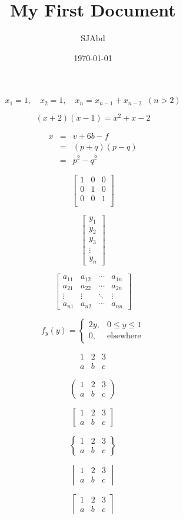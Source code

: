 \documentclass[a4paper,12pt]{article}
\begin{document}
\title{My First Document}
\author{SJAbd}
\date{\today}
\maketitle


$$
x_1=1,\quad x_2=1,\quad x_n=x_{n-1}+x_{n-2}\;\;(n>2)
$$


\begin{equation*}
(x+2)(x-1)=x^2+x-2
\end{equation*}


\begin{eqnarray*}
x&=&v+6b-f\\
&=&(p+q)(p-q)\\
&=&p^2-q^2
\end{eqnarray*}



\[
\begin{bmatrix}
1&0&0\\
0&1&0\\
0&0&1\\
\end{bmatrix}
\]



\[
\begin{bmatrix}
y_1\\
y_2\\
y_3\\
\vdots\\
y_n
\end{bmatrix}
\]




\[
\begin{bmatrix}
a_{11}&a_{12}&\cdots &a_{1n} \\
a_{21}&a_{22}&\cdots &a_{2n} \\
\vdots & \vdots & \ddots & \vdots\\
a_{n1}&a_{n2}&\cdots &a_{nn}
\end{bmatrix}
\]



\[f_y(y)=\left\{\begin{array}{cl}
2y,&0\leq y \leq 1\\
0,& \mbox{elsewhere}\end{array}\right.\]


\newpage


$$
\begin{matrix}
1 & 2 & 3\\
a & b & c
\end{matrix}
$$


$$
\begin{pmatrix}
1 & 2 & 3\\
a & b & c
\end{pmatrix}	
$$


$$
\begin{bmatrix}
1 & 2 & 3\\
a & b & c
\end{bmatrix}
$$


$$
\begin{Bmatrix}
1 & 2 & 3\\
a & b & c
\end{Bmatrix}
$$



$$
\begin{vmatrix}
1 & 2 & 3\\
a & b & c
\end{vmatrix}
$$


$$
\left\lceil
\begin{matrix}
1 & 2 & 3\\
a & b & c
\end{matrix}
\right\rceil
$$
\end{document}
